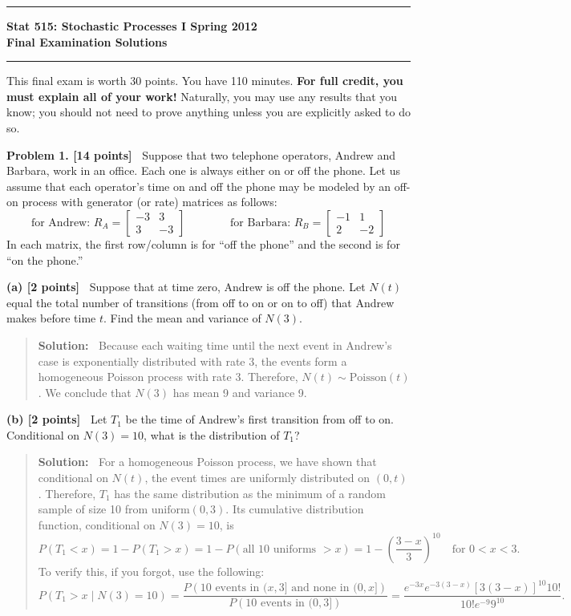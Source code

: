 \documentclass{article}
\newcommand{\svskip}{\vspace{.2in}}
\newcommand{\mvskip}{\vspace{.25in}}
\newcommand{\lvskip}{\vspace{.5in}}
\begin{document}
        \hrule
        \begin{center}
        \Large\bf Stat 515: Stochastic Processes I \hfill Spring 2012\\
        Final Examination  \hfill Solutions
        \end{center}
        \hrule


\mvskip 
This final exam is worth 30 points.  You have 110 minutes.  
{\bf For full credit, you must explain all of your work!}
Naturally, you may use any results that you know; you should not need to prove anything
unless you are explicitly asked to do so.



\lvskip 
{\bf Problem 1. [14 points]\ } 
Suppose that two telephone operators, Andrew and Barbara, work in an office.
Each one is always either on or off the phone.  Let us assume that each operator's 
time on and off the phone may be modeled by an off-on process with generator (or rate)
matrices as follows:
\[
\mbox{for Andrew:\ }
R_A = \begin{bmatrix} -3 & 3 \\ 3 & -3\end{bmatrix}
\qquad\qquad
\mbox{for Barbara:\ }
R_B = \begin{bmatrix} -1 & 1 \\ 2 & -2\end{bmatrix}
\]
In each matrix, the first row/column is for ``off the phone'' and the second is for ``on the phone.''

\svskip
{\bf(a) [2 points]\ }
Suppose that at time zero, Andrew is off the phone.   
Let $N(t)$ equal the total number of transitions (from off to on or on to off) that Andrew makes
before time $t$.  Find the mean and variance of $N(3)$.
\begin{quotation}{\bf Solution:\ }
Because each waiting time until the next event in Andrew's case is exponentially distributed
with rate 3, the events form a homogeneous Poisson process with rate 3.  Therefore,
$N(t)\sim \mbox{Poisson}(t)$.  We conclude that $N(3)$ has mean 9 and variance 9.
\end{quotation}

\svskip
{\bf(b) [2 points]\ }
Let $T_1$ be the time of Andrew's first transition from off to on.  
Conditional on $N(3)=10$, what is the distribution of $T_1$?
\begin{quotation}{\bf Solution:\ }
For a homogeneous Poisson process, we have shown that conditional on $N(t)$, the event
times are uniformly distributed on $(0, t)$.  Therefore, $T_1$ has the same distribution as the
minimum of a random sample of size 10 from $\mbox{uniform}(0,3)$.  Its cumulative distribution
function, conditional on $N(3)=10$, is
\[
P(T_1<x) = 1-P(T_1>x) = 1-P(\mbox{all 10 uniforms $>x$}) = 
1- \left( \frac{3-x}{3} \right)^{10} \quad\mbox{for $0<x<3$.}
\]
To verify this, if you forgot, use the following:
\[
P(T_1>x\mid N(3)=10) = \frac{P(\mbox{10 events in $(x, 3]$ and none in $(0,x]$})}
{P(\mbox{10 events in $(0, 3]$})} =
\frac{e^{-3x} e^{-3(3-x)}[3(3-x)]^{10} 10!}{10!e^{-9}9^{10}} .
\]
\end{quotation}
\end{document}
